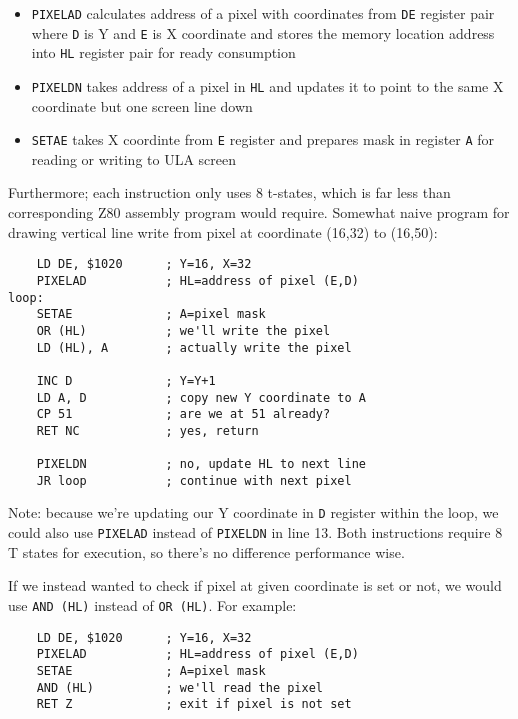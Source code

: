 \documentclass[12pt,twoside,openright,a4paper]{book}
\begin{document}
\begin{itemize}[topsep=1pt,itemsep=1pt]
	\item {\tt PIXELAD} calculates address of a pixel with coordinates from {\tt DE} register pair where {\tt D} is Y and {\tt E} is X coordinate and stores the memory location address into {\tt HL} register pair for ready consumption
	
	\item {\tt PIXELDN} takes address of a pixel in {\tt HL} and updates it to point to the same X coordinate but one screen line down
	
	\item {\tt SETAE} takes X coordinte from {\tt E} register and prepares mask in register {\tt A} for reading or writing to ULA screen
\end{itemize}

Furthermore; each instruction only uses 8 t-states, which is far less than corresponding Z80 assembly program would require. Somewhat naive program for drawing vertical line write from pixel at coordinate (16,32) to (16,50):

\begin{lstlisting}
	LD DE, $1020      ; Y=16, X=32
	PIXELAD           ; HL=address of pixel (E,D)
loop:
	SETAE             ; A=pixel mask
	OR (HL)           ; we'll write the pixel
	LD (HL), A        ; actually write the pixel
	
	INC D             ; Y=Y+1
	LD A, D           ; copy new Y coordinate to A
	CP 51             ; are we at 51 already?
	RET NC            ; yes, return

	PIXELDN           ; no, update HL to next line
	JR loop           ; continue with next pixel
\end{lstlisting}

Note: because we're updating our Y coordinate in {\tt D} register within the loop, we could also use {\tt PIXELAD} instead of {\tt PIXELDN} in line 13. Both instructions require 8 T states for execution, so there's no difference performance wise.

If we instead wanted to check if pixel at given coordinate is set or not, we would use {\tt AND (HL)} instead of {\tt OR (HL)}. For example:

\begin{lstlisting}
	LD DE, $1020      ; Y=16, X=32
	PIXELAD           ; HL=address of pixel (E,D)
	SETAE             ; A=pixel mask
	AND (HL)          ; we'll read the pixel
	RET Z             ; exit if pixel is not set
\end{lstlisting}
\end{document}
